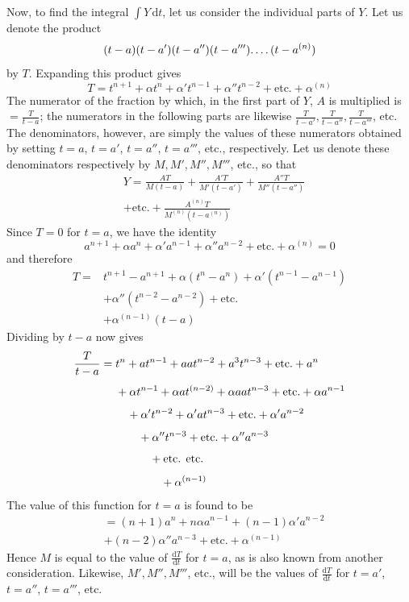 Now, to find the integral $\int Y\,\mathrm{d}t$, let us consider the individual parts of $Y$. Let us denote the product
\[
(t-a)(t-a')(t-a'')(t-a''')\ldotp\ldotp\ldotp\ldotp(t-a^{(n)})
\]
by $T$. Expanding this product gives
\[
T=t^{n+1}+\alpha t^n+\alpha't^{n-1}+\alpha''t^{n-2}+\text{etc.}+\alpha^{(n)}
\]
The numerator of the fraction by which, in the first part of $Y$, $A$ is multiplied is $=\frac{T}{t-a}$; the numerators in the following parts are likewise $\frac{T}{t-a'},\frac{T}{t-a''},\frac{T}{t-a'''}$, etc. The denominators, however, are simply the values of these numerators obtained by setting $t=a$, $t=a'$, $t=a''$, $t=a'''$, etc., respectively. Let us denote these denominators respectively by $M,M',M'',M'''$, etc., so that
\[
\begin{aligned}&Y=\frac{AT}{M(t-a)}+\frac{A'T}{M'(t-a')}+\frac{A''T}{M''(t-a'')}\\ &+\text{etc.}+\frac{A^{(n)}T}{M^{(n)}(t-a^{(n)})}\end{aligned}
\]
Since $T=0$ for $t=a$, we have the identity
\[
a^{n+1}+\alpha a^n+\alpha'a^{n-1}+\alpha''a^{n-2}+\text{etc.}+\alpha^{(n)}=0
\]
and therefore
\[
\begin{aligned}
T={}&t^{n+1}-a^{n+1}+\alpha(t^n-a^n)+\alpha'(t^{n-1}-a^{n-1})
\\ &+\alpha''(t^{n-2}-a^{n-2})+\text{etc.}\\
&+\alpha^{(n-1)}(t-a)
\end{aligned}
\]
Dividing by $t-a$ now gives
\[
\begin{aligned}
\frac{T}{t-a}={}&t^n+at^{n-1}+aat^{n-2}+a^3t^{n-3}+\text{etc.}+a^n\\[4pt]
&+\alpha t^{n-1}+\alpha at^{(n-2)}+\alpha aat^{n-3}+\text{etc.}+\alpha a^{n-1}\\[4pt]
&\hspace{1.01em}+\alpha't^{n-2}+\alpha'at^{n-3}+\text{etc.}+\alpha'a^{n-2}\\[4pt]
&\hspace{2.01em}+\alpha''t^{n-3}+\text{etc.}+\alpha''a^{n-3}\\[4pt]
&\hspace{3.01em}+\text{etc. etc.}\\[4pt]
&\hspace{4.01em}+\alpha^{(n-1)}
\end{aligned}
\]
The value of this function for $t=a$ is found to be
\[
\begin{aligned}&=(n+1)a^n+n\alpha a^{n-1}+(n-1)\alpha'a^{n-2}\\ &+(n-2)\alpha''a^{n-3}
+\text{etc.}+\alpha^{(n-1)}\end{aligned}
\]
Hence $M$ is equal to the value of $\frac{\mathrm{d}T}{\mathrm{d}t}$ for $t=a$, as is also known from another consideration. Likewise, $M',M'',M'''$, etc., will be the values of $\frac{\mathrm{d}T}{\mathrm{d}t}$ for $t=a'$, $t=a''$, $t=a'''$, etc.

